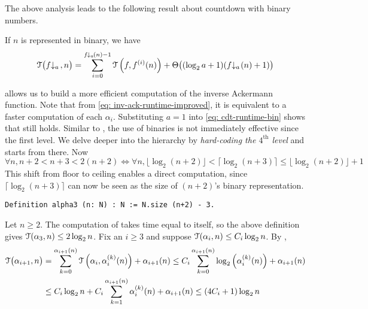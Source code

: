 The above analysis leads to the following result about countdown with binary numbers.
\begin{thm} \label{thm: cdt-runtime-bin}
	If $n$ is represented in binary, we have
	\begin{equation} \label{eq: cdt-runtime-bin}
	\runtime\big(\cdt{f}{a}\ , n\big) = \sum_{i=0}^{\cdt{f}{a}(n) - 1}
	\runtime\left(f, f^{(i)}(n)\right) + \Theta\big((\log_2a + 1)(\cdt{f}{a}(n) + 1)\big)
	\end{equation}
\end{thm}
 allows us to build a more efficient computation of the inverse Ackermann function. Note that from \eqref{eq: inv-ack-runtime-improved}, it is equivalent to a faster computation of each $\alpha_i$. Substituting $a=1$ into \eqref{eq: cdt-runtime-bin} shows that  still holds.
Similar to , the use of binaries is not immediately effective since the first level. We delve deeper into the hierarchy by \emph{hard-coding the $4^{\text{th}}$ level} and starts from there. Now
\begin{equation*}
\forall n, n+2  < n+3 < 2(n+2) \iff \forall n,
\lfloor \log_2(n+2) \rfloor < \lceil \log_2(n+3) \rceil \le \lfloor \log_2(n+2) \rfloor + 1
\end{equation*}
This shift from floor to ceiling enables a direct computation, since $\lceil \log_2(n+3) \rceil$ can now be seen as the size of $(n+2)$'s binary representation.
\begin{lstlisting}
Definition alpha3 (n: N) : N := N.size (n+2) - 3.
\end{lstlisting}
Let $n\ge 2$. The computation of  takes time equal to itself, so the above definition gives $\mathcal{T}(\alpha_3, n) \le 2\log_2n$. Fix an $i\ge 3$ and suppose $\mathcal{T}(\alpha_i, n) \le C_i\log_2n$. By ,
\begin{equation*}
\begin{aligned}
\mathcal{T}\big(\alpha_{i+1}, n\big) & = \sum_{k=0}^{\alpha_{i+1}(n)} \mathcal{T}\left(\alpha_i, \alpha_i^{(k)}(n)\right) + \alpha_{i+1}(n)
\le C_i\sum_{k=0}^{\alpha_{i+1}(n)}\log_2 \left(\alpha_i^{(k)}(n)\right) + \alpha_{i+1}(n)\\
 & \le C_i\log_2n + C_i\sum_{k=1}^{\alpha_{i+1}(n)}\alpha_i^{(k)}(n) + \alpha_{i+1}(n)
 \le (4C_i+1)\log_2n
\end{aligned}
\end{equation*}

